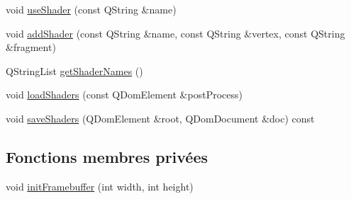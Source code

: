 \begin{DoxyCompactItemize}
void \hyperlink{class_my_open_g_l_widget_a87b9f933f545bf6f257820395771cc8b}{use\+Shader} (const Q\+String \&name)
\item 
void \hyperlink{class_my_open_g_l_widget_a1426e6f24592838e16c22a92870cf5f4}{add\+Shader} (const Q\+String \&name, const Q\+String \&vertex, const Q\+String \&fragment)
\item 
Q\+String\+List \hyperlink{class_my_open_g_l_widget_a99929e3c743d4f5793ef0e09ab61f2b2}{get\+Shader\+Names} ()
\item 
void \hyperlink{class_my_open_g_l_widget_af7899fd91898c1ed5dc228d7d6de658e}{load\+Shaders} (const Q\+Dom\+Element \&post\+Process)
\item 
void \hyperlink{class_my_open_g_l_widget_a177cfabda79d05c834b4f1a3f370a620}{save\+Shaders} (Q\+Dom\+Element \&root, Q\+Dom\+Document \&doc) const 
\end{DoxyCompactItemize}
\subsection*{Fonctions membres privées}
\begin{DoxyCompactItemize}
\item 
void \hyperlink{class_my_open_g_l_widget_ae2bcca23e0802d6f5ebf2ee3e6ed6e7a}{init\+Framebuffer} (int width, int height)
\end{DoxyCompactItemize}
